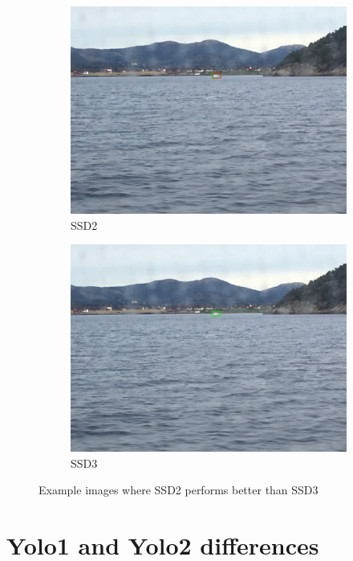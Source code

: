 \begin{figure}[h!]
\begin{subfigure}{.5\textwidth}
  \centering
  \includegraphics[width=0.8\linewidth]{results/case_buildings/ssdtrf/ssd2/2better/IMG_2463.jpg}
  \caption{SSD2}
\end{subfigure}%
\begin{subfigure}{.5\textwidth}
  \centering
  \includegraphics[width=.8\linewidth]{results/case_buildings/ssdtrf/ssd3/2better/IMG_2463.jpg}
  \caption{SSD3}
\end{subfigure}
\caption{Example images where SSD2 performs better than SSD3}
\label{img:ssd_trf_3better}
\end{figure}


\section{Yolo1 and Yolo2 differences}

